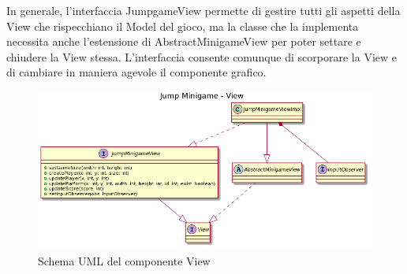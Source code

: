 \documentclass[a4paper,12pt]{report}
\begin{document}
	In generale, l'interfaccia JumpgameView permette di gestire tutti gli aspetti della View che rispecchiano il Model del gioco, ma la classe che la implementa necessita anche l'estensione di AbstractMinigameView per poter settare e chiudere la View stessa.
    L'interfaccia consente comunque di scorporare la View e di cambiare in maniera agevole il componente grafico.\newline
    \begin{figure}[h]
        \centering{}
        \includegraphics[width=150mm]{images/picchiotti/jumpview.png}
        \caption{Schema UML del componente View}
        \label{img:jumpview}
    \end{figure}
\end{document}
